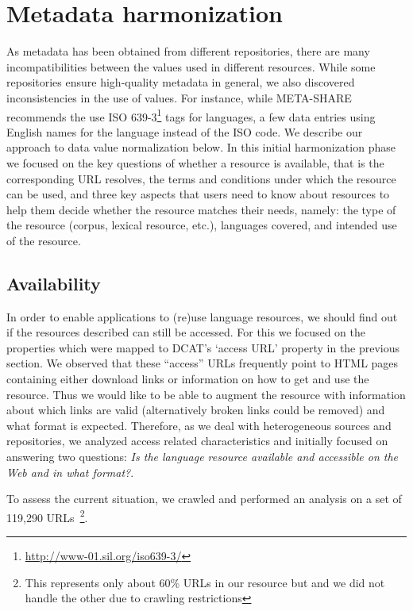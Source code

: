 \documentclass[11pt]{article}
\begin{document}
\section{Metadata harmonization}

\label{harmonization}

As metadata has been obtained from different repositories, there are many incompatibilities between the values used in different resources. 
While some repositories ensure high-quality metadata in general, we also
discovered inconsistencies in the use of values. For instance, while META-SHARE
recommends the use ISO 639-3\footnote{\url{http://www-01.sil.org/iso639-3/}} tags for
languages, a few data entries using English names for the language
instead of the ISO code. We describe our approach to data value normalization below. In this initial harmonization phase we focused on the key
questions of whether a resource is available, that is the corresponding URL resolves, the terms and conditions under which the resource can be used, and
three key aspects that users need to know about resources to help them decide whether the resource matches their needs, namely: the type of the resource (corpus, lexical resource, etc.), languages covered, and intended use of the resource.

\subsection{Availability}

In order to enable applications to (re)use language resources, we should find
out if the resources described can still be accessed. For this we focused on the
properties which were mapped to DCAT's `access URL' property in the previous
section. We observed that these ``access'' URLs frequently point to HTML pages
containing either download links or information on how to get and use the
resource. Thus we would like to be able to augment the resource with information
about which links are valid (alternatively broken links could be removed)
and what format is expected. Therefore, as we deal with heterogeneous sources and repositories, we 
analyzed access related characteristics and initially focused on answering two 
questions: \textit{Is the language resource available and accessible on the Web
and in what format?}.

To assess the current situation, we crawled and performed an analysis on a set of 
119,290 URLs~\footnote{This represents only about 60\% URLs in our resource but
and we did not handle the other due to crawling restrictions}.
\end{document}
